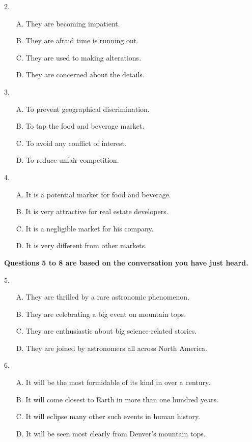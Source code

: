 \documentclass[UTF8,11pt]{ctexart}
\begin{document}
2.


\begin{itemize}[leftmargin=2em,itemsep=.2em,topsep=.4em]\item[A.] They are becoming impatient.
\item[B.] They are afraid time is running out.
\item[C.] They are used to making alterations.
\item[D.] They are concerned about the details.
\end{itemize}

3.


\begin{itemize}[leftmargin=2em,itemsep=.2em,topsep=.4em]\item[A.] To prevent geographical discrimination.
\item[B.] To tap the food and beverage market.
\item[C.] To avoid any conflict of interest.
\item[D.] To reduce unfair competition.
\end{itemize}

4.


\begin{itemize}[leftmargin=2em,itemsep=.2em,topsep=.4em]\item[A.] It is a potential market for food and beverage.
\item[B.] It is very attractive for real estate developers.
\item[C.] It is a negligible market for his company.
\item[D.] It is very different from other markets.
\end{itemize}

\textbf{Questions 5 to 8 are based on the conversation you have just heard.}


5.


\begin{itemize}[leftmargin=2em,itemsep=.2em,topsep=.4em]\item[A.] They are thrilled by a rare astronomic phenomenon.
\item[B.] They are celebrating a big event on mountain tops.
\item[C.] They are enthusiastic about big science-related stories.
\item[D.] They are joined by astronomers all across North America.
\end{itemize}

6.


\begin{itemize}[leftmargin=2em,itemsep=.2em,topsep=.4em]\item[A.] It will be the most formidable of its kind in over a century.
\item[B.] It will come closest to Earth in more than one hundred years.
\item[C.] It will eclipse many other such events in human history.
\item[D.] It will be seen most clearly from Denver’s mountain tops.
\end{itemize}
\end{document}
